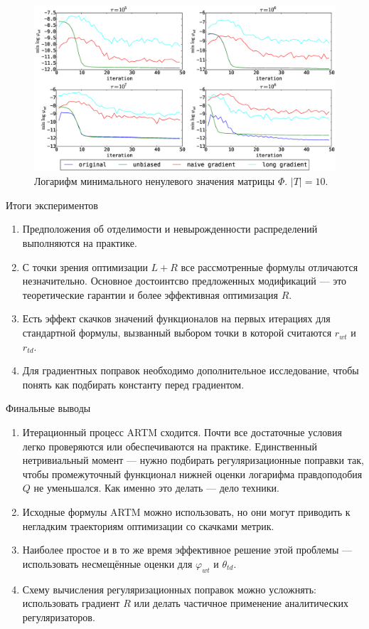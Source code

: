\documentclass[utf8]{beamer}
\renewcommand{\phi}{\varphi}
\begin{document}
\begin{frame}
\begin{figure}[h]
	\centering
	\caption{Логарифм минимального ненулевого значения матрицы $\Phi$. $|T| = 10$.}    
	\includegraphics[width=1.0\linewidth]{presentation_pictures/topics_10_minPhi_values}
\end{figure}
\end{frame}
	
	
\begin{frame}{Итоги экспериментов}
\begin{enumerate}
\item Предположения об отделимости и невырожденности распределений выполняются на практике.
\item С точки зрения оптимизации $L +  R$ все рассмотренные формулы отличаются незначительно. Основное достоинтсво предложенных модификаций --- это теоретические гарантии и более эффективная оптимизация $R$.
\item Есть эффект скачков значений функционалов на первых итерациях для стандартной формулы, вызванный выбором точки в которой считаются $r_{wt}$ и $r_{td}$.
\item Для градиентных поправок необходимо дополнительное исследование, чтобы понять как подбирать константу перед градиентом.
\end{enumerate}
\end{frame}

\begin{frame}{Финальные выводы}
\begin{enumerate}
\item Итерационный процесс ARTM сходится. Почти все  достаточные условия легко проверяются или обеспечиваются на практике. Единственный нетривиальный момент --- нужно подбирать регуляризационные поправки так, чтобы промежуточный функционал нижней оценки логарифма правдоподобия $Q$ не уменьшался. Как именно это делать --- дело техники.
\item Исходные формулы ARTM можно использовать, но они могут приводить к негладким траекториям оптимизации со скачками метрик.
\item Наиболее простое и в то же время эффективное решение этой проблемы --- использовать несмещённые оценки для $\phi_{wt}$ и $\theta_{td}$.
\item Схему вычисления регуляризационных поправок можно усложнять: использовать градиент $R$ или делать частичное применение аналитических регуляризаторов.
\end{enumerate}
\end{frame}
\end{document}
